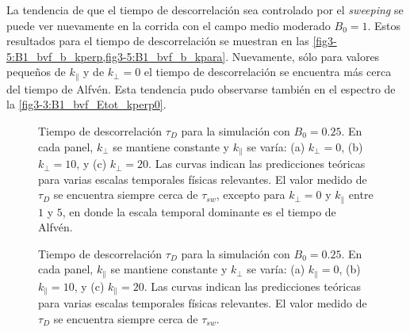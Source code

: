 La tendencia de que el tiempo de descorrelación sea controlado por el
\textit{sweeping} se puede ver nuevamente en la corrida con el campo medio
moderado $B_0=1$. Estos resultados para el tiempo de descorrelación se
muestran en
las \cref{fig3-5:B1_bvf_b_kperp,fig3-5:B1_bvf_b_kpara}. Nuevamente, sólo
para valores pequeños de $k_{\parallel}$ y de $k_{\perp}=0$ el tiempo
de descorrelación se encuentra más cerca del tiempo de Alfvén. Esta
tendencia pudo observarse también en el espectro de la
\cref{fig3-3:B1_bvf_Etot_kperp0}.

\begin{figure}
  \centering

  \caption{Tiempo de descorrelación $\tau_D$ para la simulación con
    $B_0=0.25$. En cada panel, $k_\perp$ se mantiene constante y
    $k_\parallel$ se varía: (a) $k_\perp = 0$, (b) $k_\perp = 10$,
    y (c) $k_\perp = 20$. Las curvas indican las predicciones teóricas
    para varias escalas temporales físicas relevantes. El valor medido de $\tau_D$
    se encuentra siempre cerca de $\tau_{sw}$, excepto para $k_\perp = 0$
    y $k_\parallel$ entre $1$ y $5$, en donde la escala temporal
    dominante es el tiempo de Alfv\'en.}
  \label{fig3-5:B025_bvf_b_kperp}
\end{figure}

\begin{figure}
  \centering

  \caption{Tiempo de descorrelación $\tau_D$ para la simulación con
    $B_0=0.25$. En cada panel, $k_\parallel$ se mantiene constante y
    $k_\perp$ se varía: (a) $k_\parallel = 0$, (b) $k_\parallel = 10$,
    y (c) $k_\parallel = 20$. Las curvas indican las predicciones teóricas
    para varias escalas temporales físicas relevantes. El valor medido de $\tau_D$
    se encuentra siempre cerca de $\tau_{sw}$.}
  \label{fig3-5:B025_bvf_b_kpara}
\end{figure}

